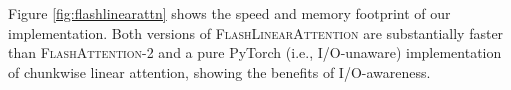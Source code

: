 

%
 Figure \ref{fig:flashlinearattn} shows the speed and memory footprint of our implementation. Both versions of \textsc{FlashLinearAttention} are substantially faster than \textsc{FlashAttention-2} \cite{flashattention2} and a pure PyTorch (i.e., I/O-unaware) implementation of chunkwise linear attention, showing the benefits of I/O-awareness. 

%

%

